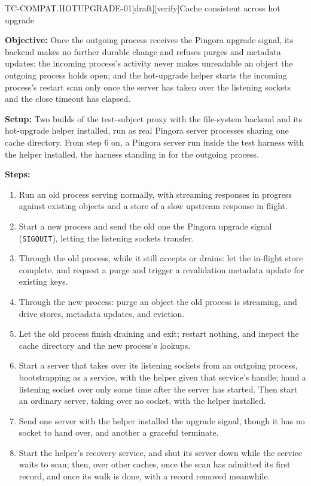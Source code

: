 \begin{requirement}{TC-COMPAT.HOTUPGRADE-01}[draft][verify]{Cache consistent across hot upgrade}


  \textbf{Objective:} Once the outgoing process receives the Pingora upgrade
  signal, its backend makes no further durable change and refuses purges and
  metadata updates; the incoming process's activity never makes unreadable an
  object the outgoing process holds open; and the hot-upgrade helper starts
  the incoming process's restart scan only once the server has taken over
  the listening sockets and the close timeout has elapsed.

  \textbf{Setup:} Two builds of the test-subject proxy with the file-system
  backend and its hot-upgrade helper installed, run as real Pingora server
  processes sharing one cache directory. From step 6 on, a Pingora server
  run inside the test harness with the helper installed, the harness
  standing in for the outgoing process.

  \textbf{Steps:}
  \begin{enumerate}
    \item Run an old process serving normally, with streaming responses in
      progress against existing objects and a store of a slow upstream
      response in flight.
    \item Start a new process and send the old one the Pingora upgrade signal
      (\texttt{SIGQUIT}), letting the listening sockets transfer.
    \item Through the old process, while it still accepts or drains: let the
      in-flight store complete, and request a purge and trigger a
      revalidation metadata update for existing keys.
    \item Through the new process: purge an object the old process is
      streaming, and drive stores, metadata updates, and eviction.
    \item Let the old process finish draining and exit; restart nothing, and
      inspect the cache directory and the new process's lookups.
    \item Start a server that takes over its listening sockets from an
      outgoing process, bootstrapping as a service, with the helper given
      that service's handle; hand a listening socket over only some time
      after the server has started. Then start an ordinary server, taking
      over no socket, with the helper installed.
    \item Send one server with the helper installed the upgrade signal,
      though it has no socket to hand over, and another a graceful
      terminate.
    \item Start the helper's recovery service, and shut its server down
      while the service waits to scan; then, over other caches, once the
      scan has admitted its first record, and once its walk is done, with
      a record removed meanwhile.
  \end{enumerate}


\end{requirement}
